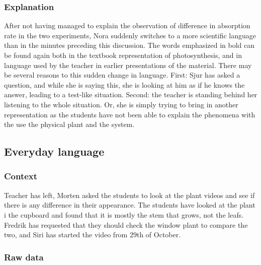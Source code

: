 \subsubsection*{Explanation}
After not having managed to explain the observation of difference in absorption rate in the two experiments, Nora suddenly switches to a more scientific language than in the minutes preceding this discussion. The words emphasized in bold can be found again both in the textbook representation of photosynthesis, and in language used by the teacher in earlier presentations of the material. There may be several reasons to this sudden change in language. First: Sjur has asked a question, and while she is saying this, she is looking at him as if he knows the answer, leading to a test-like situation. Second: the teacher is standing behind her listening to the whole situation. Or, she is simply trying to bring in another representation as the students have not been able to explain the phenomena with the use the physical plant and the system. 


\subsection{Everyday language}


\subsubsection*{Context}
Teacher has left, Morten asked the students to look at the plant videos and see if there is any difference in their appearance. The students have looked at the plant i the cupboard and found that it is mostly the stem that grows, not the leafs. Fredrik has requested that they should check the window plant to compare the two, and Siri has started the video from 29th of October.


\subsubsection*{Raw data}

